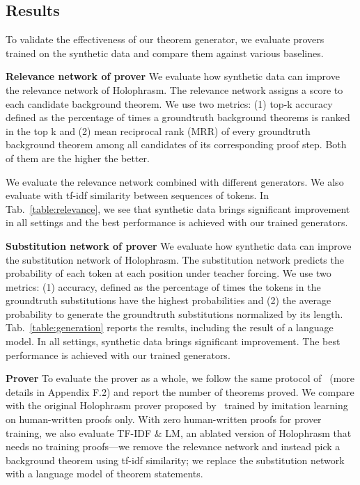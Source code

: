 \documentclass{article}
\begin{document}
\subsection{Results}

To validate the effectiveness of our theorem generator, we evaluate provers trained on the synthetic data and compare them against various baselines. 

\noindent\textbf{Relevance network of prover}
We evaluate how synthetic data can improve the relevance network of Holophrasm. The relevance network assigns a score to each candidate background theorem. 
We use two metrics: (1) top-k accuracy defined as the percentage of times a groundtruth background theorems is ranked in the top k and 
(2) mean reciprocal rank (MRR) of every groundtruth background theorem among all candidates of its corresponding proof step. Both of them are the higher the better.

We evaluate the relevance network combined with different generators. We also evaluate with tf-idf similarity between sequences of tokens. 
In Tab.~\ref{table:relevance},
we see that synthetic data brings significant improvement in all settings and
the best performance is achieved with our trained generators. 

\noindent\textbf{Substitution network of prover}
We evaluate how synthetic data can improve the substitution network of Holophrasm. 
The substitution network predicts the probability of each token at each position under teacher forcing.
We use two metrics: (1) accuracy, defined as the percentage of times the tokens in the groundtruth substitutions have the highest probabilities and (2) the average probability to generate the groundtruth substitutions normalized by its length. Tab.~\ref{table:generation} reports the results, including the result of a language model. 
In all settings, synthetic data brings significant improvement. 
The best performance is achieved with our trained generators. 

\noindent\textbf{Prover}
To evaluate the prover as a whole, we follow the same protocol of~\citet{whalen2016holophrasm} (more details in Appendix F.2) and report the number of theorems proved. We compare with the original Holophrasm prover proposed by~\citet{whalen2016holophrasm} trained 
by imitation learning on human-written proofs only. With zero human-written proofs for prover training, 
we also evaluate TF-IDF \& LM, an ablated version of Holophrasm that needs no training proofs---we remove the relevance network and instead pick a background theorem using tf-idf similarity; we replace the substitution network with a language model of theorem statements.
\end{document}
